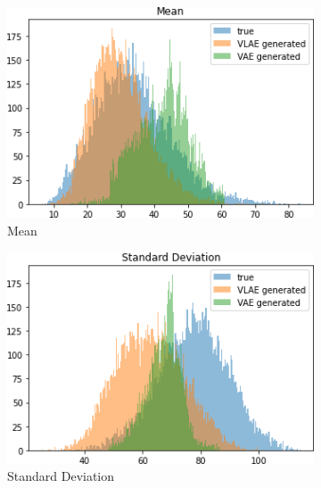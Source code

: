 \begin{figure}
    \centering
    \begin{subfigure}{0.4\textwidth}
        \centering
        \includegraphics[width=\textwidth]{images/vlae_generated_vs_true/mnist_vs_vlae_mean.png}
        \caption{Mean}
        \label{subfig:vlae_mean_generated_vs_true}
    \end{subfigure}
    \hfill
    \begin{subfigure}{0.4\textwidth}
        \centering
        \includegraphics[width=\textwidth]{images/vlae_generated_vs_true/mnist_vs_vlae_sd.png}
        \caption{Standard Deviation}
        \label{subfig:vae_sd_generated_vs_true}
    \end{subfigure}
    \hfill
    \begin{subfigure}{0.4\textwidth}
        \centering

\end{subfigure}
\end{figure}
